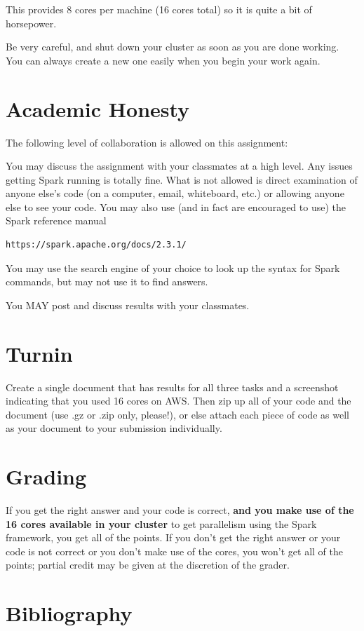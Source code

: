 \documentclass[11pt]{article}
\renewcommand\:{\colon} %
\begin{document}
This provides 8 cores per machine (16 cores total) so it is quite a bit of horsepower. 

Be very careful, and shut down
your cluster as soon as you are done working.  You can always create a new one easily when you begin your work again.

\section*{Academic Honesty}
The following level of collaboration is allowed on this assignment: 

You may discuss the assignment with your classmates at a high level. Any issues getting Spark running is totally fine. What is not allowed is direct examination of anyone else's code (on a computer, email, whiteboard, etc.) or allowing anyone else to see your code. You may also use (and in fact are encouraged to use) the Spark reference manual \begin{verbatim}https://spark.apache.org/docs/2.3.1/\end{verbatim}

You may use the search engine of your choice to look up the syntax for Spark commands, but may not use it to find answers.

You MAY post and discuss results with your classmates. 

\section{Turnin}

Create a single document that has results for all three tasks and a screenshot indicating that you used 16 cores on AWS.
Then zip up all of your code and the document (use .gz or .zip only, please!), or else attach each piece of code
as well as your document to your submission individually.  

\section{Grading}

If you get the right answer and your code is correct,
\textbf{and you make use of the 16 cores available in your cluster} to get parallelism using the Spark framework,
you get all of the points.  
If you don't get the right answer or your code is not correct or you don't make use of the cores,
you won't get all of the points; partial credit may be given
at the discretion of the grader.

\section*{Bibliography}
			

\end{document}
